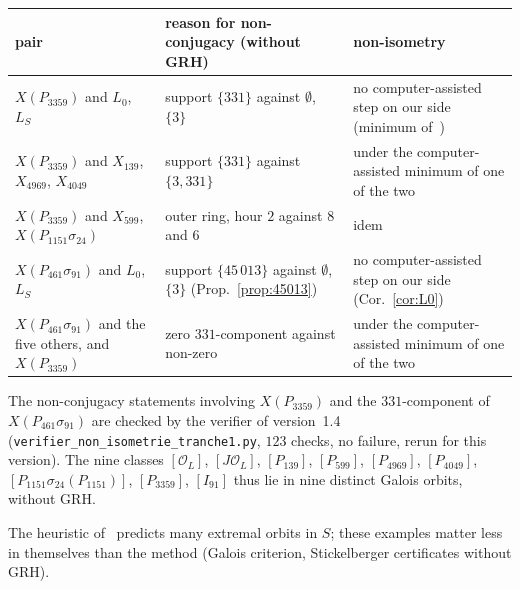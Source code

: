 \documentclass[11pt,a4paper]{amsart}
\theoremstyle{plain}
\theoremstyle{definition}
\newcommand{\OO}{\mathcal{O}}
\newcommand{\Lz}{L_{0}}
\newcommand{\LS}{L_{S}}
\newcommand{\XA}{X(P_{3359})}
\newcommand{\XB}{X(P_{461}\sigma_{91})}
\newcommand{\XC}{X(P_{1151}\sigma_{24})}
\begin{document}
\begin{center}\small\renewcommand{\arraystretch}{1.2}
\begin{tabular}{>{\raggedright\arraybackslash}p{3.6cm}>{\raggedright\arraybackslash}p{4.9cm}>{\raggedright\arraybackslash}p{5.6cm}}
\toprule
pair & reason for non-conjugacy (without GRH) & non-isometry \\
\midrule
$\XA$ and $\Lz$, $\LS$ & support $\{331\}$ against $\emptyset$, $\{3\}$ & no computer-assisted step on our side (minimum of~\cite{Sak26}) \\
$\XA$ and $X_{139}$, $X_{4969}$, $X_{4049}$ & support $\{331\}$ against $\{3,331\}$ & under the computer-assisted minimum of one of the two \\
$\XA$ and $X_{599}$, $\XC$ & outer ring, hour $2$ against $8$ and $6$~\cite[Cor.~4.8]{Gau26a} & idem \\
$\XB$ and $\Lz$, $\LS$ & support $\{45\,013\}$ against $\emptyset$, $\{3\}$ (Prop.~\ref{prop:45013}) & no computer-assisted step on our side (Cor.~\ref{cor:L0}) \\
$\XB$ and the five others, and $\XA$ & zero $331$-component against non-zero & under the computer-assisted minimum of one of the two \\
\bottomrule
\end{tabular}
\end{center}

The non-conjugacy statements involving $\XA$ and the $331$-component of $\XB$ are checked by the verifier of version~1.4 (\nolinkurl{verifier_non_isometrie_tranche1.py}, $123$ checks, no failure, rerun for this version). The nine classes $[\OO_L]$, $[J\OO_L]$, $[P_{139}]$, $[P_{599}]$, $[P_{4969}]$, $[P_{4049}]$, $[P_{1151}\sigma_{24}(P_{1151})]$, $[P_{3359}]$, $[I_{91}]$ thus lie in nine distinct Galois orbits, without GRH.

The heuristic of~\cite[Q2]{Gau26} predicts many extremal orbits in $S$; these examples matter less in themselves than the method (Galois criterion, Stickelberger certificates without GRH).
\end{document}
